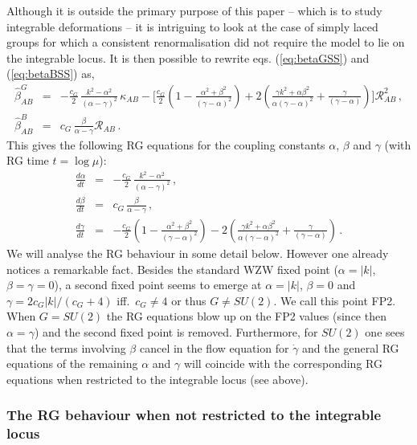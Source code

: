 \documentclass[12pt]{article}
\def\R{{\mathbb R}}
\renewcommand{\R}{\mathcal{R}}
\begin{document}
Although it is outside the primary purpose of this paper -- which is to study integrable deformations -- it is intriguing to look at the case of simply laced groups for which a consistent renormalisation did not require the model to lie on the integrable locus.  It is then possible to rewrite eqs. (\ref{eq:betaGSS}) and (\ref{eq:betaBSS}) as,
\begin{eqnarray}
\hat\beta_{AB}^{G}  &=& -\frac{c_G}{2} \,\frac{k^2- \alpha ^2}{( \alpha- \gamma )^2}\, \kappa_{AB} 
 -\Bigg[\frac{c_G}{2} \left(1-\frac{\alpha^{2}+\beta^{2}}{(\gamma - \alpha)^{2}}  \right)  +
2\left( \frac{\gamma k^{2}+\alpha \beta^{2}}{\alpha(\gamma-\alpha)^{2}} + \frac{\gamma}{(\gamma-\alpha)}  \right) \Bigg]\R^{2}_{AB}\,, \nonumber
\label{eq:betaGSSsl}\\
  \hat\beta_{AB}^{B} &=&  c_G\,\frac{\beta}{\alpha-\gamma} \R_{AB}\,.\label{eq:betaBSSsl}
 \end{eqnarray}
 This gives the following RG equations for the coupling constants $\alpha $, $\beta $ and $ \gamma $ (with RG time $t =\log\mu$):
 \begin{eqnarray}\label{eq:RGsl}
\frac{d \alpha }{dt}&=&  -\frac{c_G}{2} \,\frac{k^2- \alpha ^2}{( \alpha- \gamma )^2}\,,\nonumber\\
\frac{d \beta  }{dt}&=&  c_G\,\frac{\beta}{\alpha-\gamma}\,,\nonumber\\
\frac{d \gamma  }{dt}&=&- \frac{c_G}{2} \left(1-\frac{\alpha^{2}+\beta^{2}}{(\gamma - \alpha)^{2}}  \right)  -2\left(\frac{\gamma k^{2}+\alpha \beta^{2}}{\alpha(\gamma-\alpha)^{2}} + \frac{\gamma}{(\gamma-\alpha)}  \right)\,.
\end{eqnarray} 
We will analyse the RG behaviour in some detail below. However one already notices a remarkable fact. Besides the standard WZW fixed point ($ \alpha =|k|$, $ \beta =\gamma =0$), a second fixed point seems to emerge at $\alpha =|k|$, $ \beta =0$ and $ \gamma =2c_G|k|/(c_G+4)$ iff.\ $c_G \neq 4$ or thus $G \neq SU(2)$.  We call this point FP2.    When $G=SU(2)$ the RG equations blow up on the FP2 values (since then $\alpha=\gamma$) and the second fixed point is removed. Furthermore, for $SU(2)$ one sees that the terms involving $\beta$ cancel in the flow equation for $\dot\gamma$  and the general RG equations of the remaining $\alpha$ and $\gamma$ will coincide with the corresponding RG equations when restricted to the integrable locus (see above).   



\subsubsection*{The RG behaviour when not restricted to the integrable locus}
\end{document}

